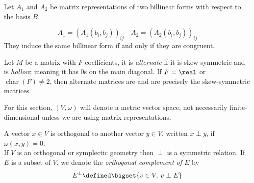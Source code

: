 \documentclass[../main-v2-manifolds.tex]{subfiles}
\begin{document}
    \begin{wts}
        Let $A_1$ and $A_2$ be matrix representations of two billinear forms with respect to the basis $B$.
        
        \[
            A_1 = (A_1(b_i,b_j))_{ij}\quad A_2 = (A_2(b_i,b_j))_{ij}
        \]
        They induce the same billinear form if and only if they are congruent. 
    \end{wts}

    \begin{definition}
        Let $M$ be a matrix with $F$-coefficients, it is \emph{alternate} if it is skew symmetric and is \emph{hollow}; meaning it has $0$s on the main diagonal. If $F=\real$ or $\operatorname{char}(F)\neq 2$, then alternate matrices are and are precisely the skew-symmetric matrices.
    \end{definition}

    For this section, $(V,\omega)$ will denote a metric vector space, not necessarily finite-dimensional unless we are using matrix representations.
    
    \begin{definition}
        A vector $x\in V$ is orthogonal to another vector $y\in V$, written $x\perp y$, if $\omega(x,y)=0$. \\

        If $V$ is an orthogonal or symplectic geometry then $\perp$ is a symmetric relation. If $E$ is a subset of $V$, we denote the \emph{orthogonal complement of $E$} by 
        \[
            E^\perp \defined \bigset{v\in V,\: v\perp E}
        \]
    \end{definition}
\end{document}
